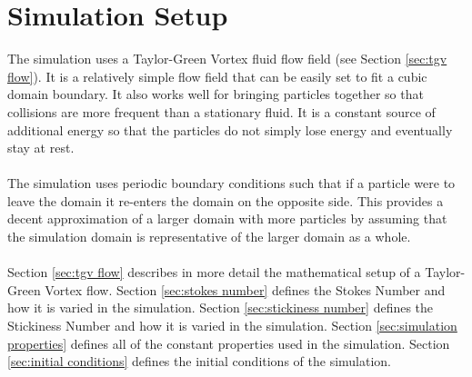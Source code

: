 \documentclass[a4paper,11pt,titlepage]{report}
\begin{document}
\section{Simulation Setup}
The simulation uses a Taylor-Green Vortex fluid flow field (see Section \ref{sec:tgv flow}). It is a relatively simple flow field that can be easily set to fit a cubic domain boundary. It also works well for bringing particles together so that collisions are more frequent than a stationary fluid. It is a constant source of additional energy so that the particles do not simply lose energy and eventually stay at rest.
\\\\The simulation uses periodic boundary conditions such that if a particle were to leave the domain it re-enters the domain on the opposite side. This provides a decent approximation of a larger domain with more particles by assuming that the simulation domain is representative of the larger domain as a whole.
\\\\Section \ref{sec:tgv flow} describes in more detail the mathematical setup of a Taylor-Green Vortex flow. Section \ref{sec:stokes number} defines the Stokes Number and how it is varied in the simulation. Section \ref{sec:stickiness number} defines the Stickiness Number and how it is varied in the simulation. Section \ref{sec:simulation properties} defines all of the constant properties used in the simulation. Section \ref{sec:initial conditions} defines the initial conditions of the simulation.
\end{document}
